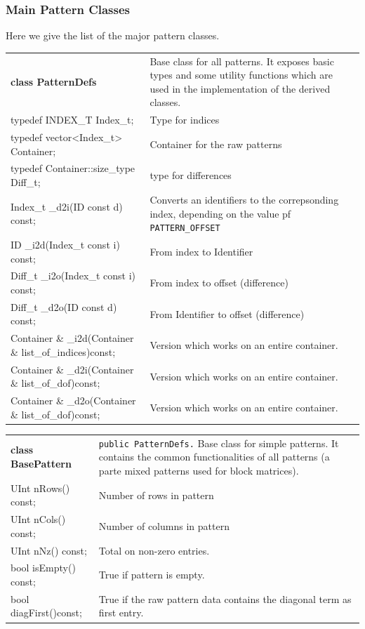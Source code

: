 \subsubsection{Main Pattern Classes}
Here we give the list of the major pattern classes.

\begin{tabularx}{\textwidth}{>{\ttfamily}lX}
  \textbf{class PatternDefs} & Base class for all patterns. It exposes basic
  types and some utility functions which are used
  in the implementation of the derived classes.\\
  typedef INDEX\_T Index\_t; & Type for indices\\
  typedef vector<Index\_t> Container; & Container for the raw patterns\\
  typedef Container::size\_type Diff\_t; & type for differences \\
  Index\_t \_d2i(ID const d) const; & Converts an identifiers to the
  correpsonding index, depending on the value pf \texttt{PATTERN\_OFFSET}\\
  ID   \_i2d(Index\_t const i) const;&From index to Identifier\\
  Diff\_t \_i2o(Index\_t const i) const; & From index to offset (difference)\\
  Diff\_t \_d2o(ID const d) const;&  From Identifier to offset (difference)\\
  Container \& \_i2d(Container \& list\_of\_indices)const;& Version which
  works
  on an entire container.\\
  Container \& \_d2i(Container \& list\_of\_dof)const;& Version which works
  on an entire container.\\
  Container \& \_d2o(Container \& list\_of\_dof)const;& Version which works
  on an entire container.\\
\end{tabularx}

\begin{tabularx}{\textwidth}{>{\ttfamily}lX}
  \textbf{class BasePattern} & \texttt{public PatternDefs.} Base class for simple patterns. It
  contains the common functionalities of all patterns (a parte mixed
  patterns used for block matrices).\\
 UInt nRows() const; & Number of rows in pattern\\
  UInt nCols() const;& Number of columns in pattern\\
  UInt nNz() const;  &  Total on non-zero entries.\\
  bool isEmpty() const; & True if  pattern    is empty.\\
  bool diagFirst()const; & True if the raw pattern data contains the
  diagonal term as first entry.\\
\end{tabularx}

